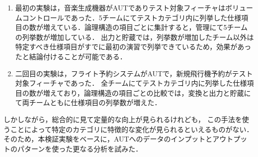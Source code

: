 \documentclass[a4paper,12pt]{jreport}
\begin{document}
\begin{enumerate}
\item 最初の実験は，音楽生成機器がAUTでありテスト対象フィーチャはボリュームコントロールであった．5チームにてテストカテゴリ内に列挙した仕様項目の数が増えている．論理構造の項目ごとに集計すると，管理にて5チームの列挙数が増加している． 出力と貯蔵では，列挙数が増加したチーム以外は特定すべき仕様項目がすでに最初の演習で列挙できているため，効果があったと結論付けることが可能である．
\item 二回目の実験は，フライト予約システムがAUTで，新規飛行機予約がテスト対象フィーチャであった． 全チームにてテストカテゴリ内に列挙した仕様項目の数が増えており，論理構造の項目ごとの比較では，変換と出力と貯蔵にて両チームともに仕様項目の列挙数が増えた．
\end{enumerate}

しかしながら，総合的に見て定量的な向上が見られるけれども， この手法を使うことによって特定のカテゴリに特徴的な変化が見られるといえるものがない．そのため，本検証実験をベースに，AUTへのデータのインプットとアウトプットのパターンを使った更なる分析を試みた．

\end{document}
